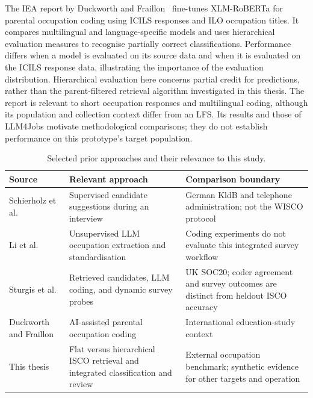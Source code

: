 The IEA report by Duckworth and Fraillon~\cite{iea2024occupationcoding}
fine-tunes XLM-RoBERTa for parental occupation coding using ICILS responses
and ILO occupation titles. It compares multilingual and language-specific
models and uses hierarchical evaluation measures to recognise partially
correct classifications. Performance differs when a model is evaluated on
its source data and when it is evaluated on the ICILS response data,
illustrating the importance of the evaluation distribution. Hierarchical
evaluation here concerns partial credit for predictions, rather than the
parent-filtered retrieval algorithm investigated in this thesis. The
report is relevant to short occupation responses and multilingual coding,
although its population and collection context differ from an LFS.
Its results and those of LLM4Jobs motivate methodological comparisons;
they do not establish performance on this prototype's target population.

\begin{table}[htbp]
\centering
\caption{Selected prior approaches and their relevance to this study.}
\label{tab:ch2-coding}
\small\renewcommand{\arraystretch}{1.3}
\begin{tabular}{>{\raggedright}p{3.1cm}
                >{\raggedright}p{4.9cm}
                >{\raggedright\arraybackslash}p{4.1cm}}
\toprule
\textbf{Source} & \textbf{Relevant approach} & \textbf{Comparison boundary} \\
\midrule
Schierholz et al.~\cite{schierholz2016interview} & Supervised candidate
  suggestions during an interview & German KldB and telephone
  administration; not the WISCO protocol \\
Li et al.~\cite{anon2025llm4jobs} & Unsupervised LLM occupation extraction
  and standardisation & Coding experiments do not evaluate this
  integrated survey workflow \\
Sturgis et al.~\cite{kochar2025socbot} & Retrieved candidates, LLM coding,
  and dynamic survey probes & UK SOC20; coder agreement and survey
  outcomes are distinct from heldout ISCO accuracy \\
Duckworth and Fraillon~\cite{iea2024occupationcoding} & AI-assisted parental
  occupation coding & International education-study context \\
This thesis & Flat versus hierarchical ISCO retrieval and integrated
  classification and review & External occupation benchmark;
  synthetic evidence for other targets and operation \\
\bottomrule
\end{tabular}
\end{table}

